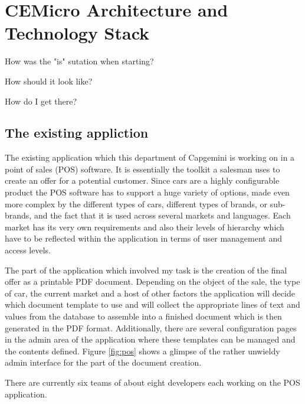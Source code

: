 \chapter{CEMicro Architecture and Technology Stack}
\label{sec:arch}

How was the "is" sutation when starting?

How should it look like?

How do I get there?


\section{The existing appliction}

The existing application which this department of Capgemini is working on in a point of sales (POS) software. It is essentially the toolkit a salesman uses to create an offer for a potential customer. Since cars are a highly configurable product the POS software has to support a huge variety of options, made even more complex by the different types of cars, different types of brands, or sub-brands, and the fact that it is used across several markets and languages. Each market has its very own requirements and also their levels of hierarchy which have to be reflected within the application in terms of user management and access levels.

The part of the application which involved my task is the creation of the final offer as a printable PDF document. Depending on the object of the sale, the type of car, the current market and a host of other factors the application will decide which document template to use and will collect the appropriate lines of text and values from the database to assemble into a finished document which is then generated in the PDF format. Additionally, there are several configuration pages in the admin area of the application where these templates can be managed and the contents defined. Figure \ref{fig:pos} shows a glimpse of the rather unwieldy admin interface for the part of the document creation.

There are currently six teams of about eight developers each working on the POS application.

